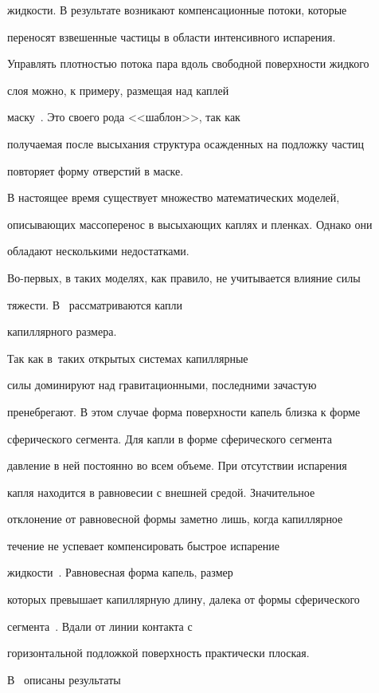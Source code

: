 жидкости. В результате возникают компенсационные потоки, которые

переносят взвешенные частицы в области интенсивного испарения.

Управлять плотностью потока пара вдоль свободной поверхности жидкого

слоя можно, к примеру, размещая над каплей

маску~\cite{Harris2007}. Это своего рода <<шаблон>>, так как

получаемая после высыхания структура осажденных на подложку частиц

повторяет форму отверстий в маске.



В настоящее время существует множество математических моделей,

описывающих массоперенос в высыхающих каплях и пленках. Однако они

обладают несколькими недостатками.



Во-первых, в таких моделях, как правило, не учитывается влияние силы

тяжести. В~\cite{Deegan2000,Fischer2002} рассматриваются капли

капиллярного размера. 

Так как в~таких открытых системах капиллярные

силы доминируют над гравитационными, последними зачастую

пренебрегают. В этом случае форма поверхности капель близка к форме

сферического сегмента. Для капли в форме сферического сегмента

давление в ней постоянно во всем объеме. При отсутствии испарения

капля находится в равновесии с внешней средой. Значительное

отклонение от равновесной формы заметно лишь, когда капиллярное

течение не успевает компенсировать быстрое испарение

жидкости~\cite{Fischer2002}. Равновесная форма капель, размер

которых превышает капиллярную длину, далека от формы сферического

сегмента~\cite{Brutin2012ReducedGravity}. Вдали от линии контакта с

горизонтальной подложкой поверхность практически плоская.

В~\cite{Brutin2012ReducedGravity} описаны результаты

